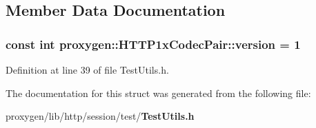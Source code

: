 \subsection{Member Data Documentation}
\subsubsection[{version}]{\setlength{\rightskip}{0pt plus 5cm}const int proxygen\+::\+H\+T\+T\+P1x\+Codec\+Pair\+::version = 1\hspace{0.3cm}{\ttfamily [static]}}\label{structproxygen_1_1HTTP1xCodecPair_aaeb3c805b2d420385a50e7056a5d4d02}


Definition at line 39 of file Test\+Utils.\+h.



The documentation for this struct was generated from the following file\+:\begin{DoxyCompactItemize}
\item 
proxygen/lib/http/session/test/{\bf Test\+Utils.\+h}\end{DoxyCompactItemize}
